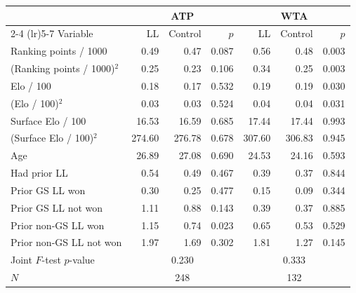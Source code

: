 \begin{tabular}{l rrr rrr}
\toprule
 & \multicolumn{3}{c}{ATP} & \multicolumn{3}{c}{WTA} \\
\cmidrule(lr){2-4} \cmidrule(lr){5-7}
Variable & LL & Control & $p$ & LL & Control & $p$ \\
\midrule
Ranking points / 1000 & 0.49 & 0.47 & 0.087 & 0.56 & 0.48 & 0.003 \\
(Ranking points / 1000)$^2$ & 0.25 & 0.23 & 0.106 & 0.34 & 0.25 & 0.003 \\
Elo / 100 & 0.18 & 0.17 & 0.532 & 0.19 & 0.19 & 0.030 \\
(Elo / 100)$^2$ & 0.03 & 0.03 & 0.524 & 0.04 & 0.04 & 0.031 \\
Surface Elo / 100 & 16.53 & 16.59 & 0.685 & 17.44 & 17.44 & 0.993 \\
(Surface Elo / 100)$^2$ & 274.60 & 276.78 & 0.678 & 307.60 & 306.83 & 0.945 \\
Age & 26.89 & 27.08 & 0.690 & 24.53 & 24.16 & 0.593 \\
Had prior LL & 0.54 & 0.49 & 0.467 & 0.39 & 0.37 & 0.844 \\
Prior GS LL won & 0.30 & 0.25 & 0.477 & 0.15 & 0.09 & 0.344 \\
Prior GS LL not won & 1.11 & 0.88 & 0.143 & 0.39 & 0.37 & 0.885 \\
Prior non-GS LL won & 1.15 & 0.74 & 0.023 & 0.65 & 0.53 & 0.529 \\
Prior non-GS LL not won & 1.97 & 1.69 & 0.302 & 1.81 & 1.27 & 0.145 \\
\midrule
Joint $F$-test $p$-value & \multicolumn{3}{c}{0.230} & \multicolumn{3}{c}{0.333} \\
$N$ & \multicolumn{3}{c}{248} & \multicolumn{3}{c}{132} \\
\bottomrule
\end{tabular}
